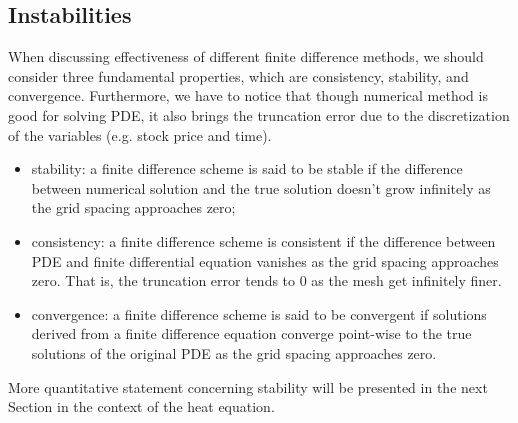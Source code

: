 
\subsection{Instabilities}
When discussing effectiveness of different finite difference methods, we should consider three fundamental properties, which are consistency, stability, and convergence. Furthermore, we have to notice that though numerical method is good for solving PDE, it also brings the truncation error due to the discretization of the variables (e.g. stock price and time).

\begin{itemize}
\item stability: a finite difference scheme is said to be stable if the difference between numerical solution and the true solution doesn't grow infinitely as the grid spacing approaches zero; %
\item consistency: a finite difference scheme is consistent if the difference between PDE and finite differential equation vanishes as the grid spacing approaches zero. That is, the truncation error tends to 0 as the mesh get infinitely finer.
\item convergence: a finite difference scheme is said to be convergent if solutions derived from a finite difference equation converge point-wise to the true solutions of the original PDE as the grid spacing approaches zero.
\end{itemize}

More quantitative statement concerning stability will be presented in the next Section in the context of the heat equation.

